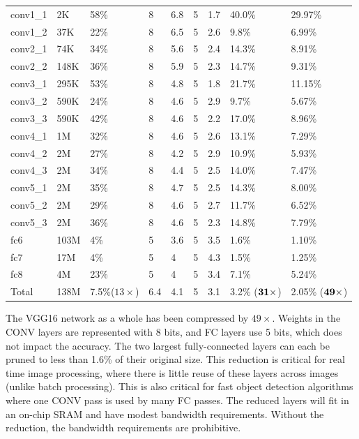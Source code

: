 \documentclass{article} %
\begin{document}
\begin{table}[t]
{\begin{tabular}{l|llllllll}
conv1\_1 & 2K & 58\% & 8 & 6.8 & 5 & 1.7 & 40.0\% & 29.97\% \\
conv1\_2 & 37K & 22\% & 8 & 6.5 & 5 & 2.6 & 9.8\% & 6.99\% \\
conv2\_1 & 74K & 34\% & 8 & 5.6 & 5 & 2.4 & 14.3\% & 8.91\% \\
conv2\_2 & 148K & 36\% & 8 & 5.9 & 5 & 2.3 & 14.7\% & 9.31\% \\
conv3\_1 & 295K & 53\% & 8 & 4.8 & 5 & 1.8 & 21.7\% & 11.15\% \\
conv3\_2 & 590K & 24\% & 8 & 4.6 & 5 & 2.9 & 9.7\% & 5.67\% \\
conv3\_3 & 590K & 42\% & 8 & 4.6 & 5 & 2.2 & 17.0\% & 8.96\% \\
conv4\_1 & 1M & 32\% & 8 & 4.6 & 5 & 2.6 & 13.1\% & 7.29\% \\
conv4\_2 & 2M & 27\% & 8 & 4.2 & 5 & 2.9 & 10.9\% & 5.93\% \\
conv4\_3 & 2M & 34\% & 8 & 4.4 & 5 & 2.5 & 14.0\% & 7.47\% \\
conv5\_1 & 2M & 35\% & 8 & 4.7 & 5 & 2.5 & 14.3\% & 8.00\% \\
conv5\_2 & 2M & 29\% & 8 & 4.6 & 5 & 2.7 & 11.7\% & 6.52\% \\
conv5\_3 & 2M & 36\% & 8 & 4.6 & 5 & 2.3 & 14.8\% & 7.79\% \\ \hline
fc6 & 103M & 4\% & 5 & 3.6 & 5 & 3.5 & 1.6\% & 1.10\% \\
fc7 & 17M & 4\% & 5 & 4 & 5 & 4.3 & 1.5\% & 1.25\% \\
fc8 & 4M & 23\% & 5 & 4 & 5 & 3.4 & 7.1\% & 5.24\% \\ \hline
Total & 138M & 7.5\%($13\times$) & 6.4 & 4.1 & 5 & 3.1 & 3.2\% ($\bf{31\times}$) & 2.05\% ($\bf{49\times}$) \\ \hline
\end{tabular}
}
\vspace{-10pt}
\label{VGGNet}
\end{table}

The VGG16 network as a whole has been compressed by $49\times$.   Weights in the CONV layers are represented with 8 bits, and FC layers use 5 bits, which does not impact the accuracy.
The two largest fully-connected layers can each be pruned to less than 1.6\% of their original size.  
This reduction is critical for real time image processing, where there is little reuse of these layers across images (unlike batch processing). This is also critical for fast object detection algorithms where one CONV pass is used by many FC passes. 
The reduced layers will fit in an on-chip SRAM and have modest bandwidth requirements.
Without the reduction, the bandwidth requirements are prohibitive.
\end{document}
